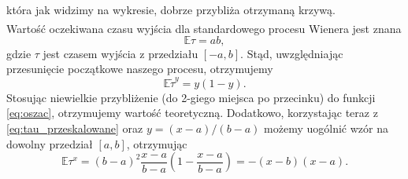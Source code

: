 \documentclass[12pt]{mwart}
\begin{document}
	która jak widzimy na wykresie, dobrze przybliża otrzymaną krzywą.\vspace{1.5mm}\\
	Wartość oczekiwana czasu wyjścia dla standardowego procesu Wienera jest znana\textsuperscript{\cite{art}}
	\begin{equation*}
		\mathbb{E}\mathbb{\tau}=ab,
	\end{equation*}
	gdzie $\tau$ jest czasem wyjścia z przedziału $[-a, b]$. Stąd, uwzględniając przesunięcie początkowe naszego procesu, otrzymujemy
	\begin{equation*}
		\mathbb{E}\widetilde\tau^y=y(1-y).
	\end{equation*}
	Stosując niewielkie przybliżenie (do 2-giego miejsca po przecinku) do funkcji \eqref{eq:oszac}, otrzymujemy wartość teoretyczną. Dodatkowo, korzystając teraz z \eqref{eq:tau_przeskalowane} oraz $y=(x-a)/(b-a)$ możemy uogólnić wzór na dowolny przedział $[a, b]$, otrzymując
	\begin{equation*}
		\mathbb{E}\tau^x=(b-a)^2\frac{x-a}{b-a}\left(1-\frac{x-a}{b-a}\right)=-(x-b)(x-a).
	\end{equation*}

	
\end{document}
